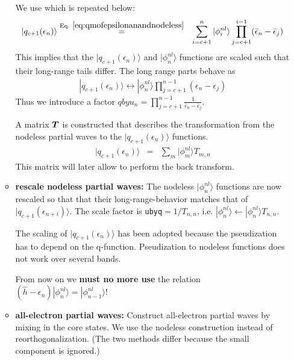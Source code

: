 \documentclass[11pt,a4paper]{report}
\begin{document}
\begin{enumerate}
\begin{itemize}
We use  which is repeated below:
\begin{eqnarray*}
|q_{c+1}(\epsilon_n)\rangle&\eqrel{eq:qmofepsilonanandnodeless}{=}&
\sum_{i=c+1}^n|\phi^{nl}_i\rangle
\prod_{j=c+1}^{i-1}(\bar{\epsilon}_n-\bar{\epsilon}_j)
\end{eqnarray*}
This implies that the $|q_{c+1}(\epsilon_{n})\rangle$ and $|\phi^{nl}_n\rangle$
functions are scaled such that their long-range tails differ.
The long range parts behave as
\begin{eqnarray*}
|q_{c+1}(\epsilon_{n})\rangle\leftrightarrow
|\phi^{nl}_{n}\rangle
\prod_{j=c+1}^{n-1}(\epsilon_{n}-\epsilon_j)
\end{eqnarray*}
Thus we introduce a factor
$qbyu_n=\prod_{j=c+1}^{n-1}\frac{1}{\bar{\epsilon}_{n}-\bar{\epsilon}_j}$.  


A matrix $\bm{T}$ is constructed that describes the transformation
from the nodeless partial waves to the $|q_{c+1}(\epsilon_n)\rangle$
functions.
\begin{eqnarray*}
|q_{c+1}(\epsilon_n)\rangle&=&\sum_m|\phi^{nl}_m\rangle T_{m,n}
\end{eqnarray*}
This matrix will later allow to perform the back transform.
%
\item \textbf{rescale nodeless partial waves:} The nodeless
  $|\phi^{nl}_n\rangle$ functions are now rescaled so that that their
  long-range-behavior matches that of
  $|q_{c+1}(\epsilon_{n+i})\rangle$. The scale factor is
  \verb|ubyq|$=1/T_{n,n}$,
  i.e. $|\phi^{nl}_n\rangle\leftarrow|\phi^{nl}_n\rangle T_{n,n}$.

  The scaling of $|q_{c+1}(\epsilon_n)\rangle$ has been adopted
  because the pseudization has to depend on the
  q-function. Pseudization to nodeless functions does not work over
  several bands.

  From now on we \textbf{must no more use} the relation
  $(\hat{h}-\epsilon_n)|\phi^{nl}_n\rangle=|\phi^{nl}_{n-1}\rangle$!

\item \textbf{all-electron partial waves:} Construct all-electron
  partial waves by mixing in the core states. We use the nodeless
  construction instead of reorthogonalization. (The two methods differ
  because the small component is ignored.)


\end{itemize}
\end{enumerate}
\end{document}
